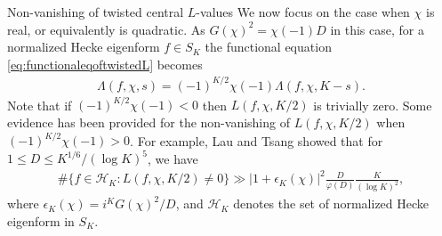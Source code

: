 \documentclass[11pt,letterpaper,reqno]{amsart}
\makeatletter
\numberwithin{figure}{section}
\numberwithin{table}{section}
\theoremstyle{definition}
\theoremstyle{plain}
\theoremstyle{definition}
\theoremstyle{definition}
\theoremstyle{remark}
\numberwithin{equation}{section}
\theoremstyle{remark}
\def\subsection{\@startsection{subsection}{2}%
  \z@{.5\linespacing\@plus.7\linespacing}{.3\linespacing}%
  {\normalfont\bfseries}}
\makeatother
\begin{document}
\subsection{Non-vanishing of twisted central \texorpdfstring{$L$-}-values}
We now focus on the case when $\chi$ is real, or equivalently is quadratic. As $G(\chi)^2=\chi(-1) D$ in this case, for a normalized Hecke eigenform $f\in S_{K}$ the functional equation \eqref{eq:functionaleqoftwistedL} becomes
\begin{align*}
    \Lambda(f,\chi,s)=(-1)^{K/2}\chi(-1)\Lambda(f,\chi,K-s).
\end{align*}
Note that if $(-1)^{K/2}\chi(-1)<0$ then $L(f,\chi,K/2)$ is trivially zero. 
Some evidence has been provided for the non-vanishing of $L(f,\chi,K/2)$ when $(-1)^{K/2}\chi(-1)>0$.
For example, Lau and Tsang \cite{LautwistedcentralLvalues} showed that for $1\leq D\leq K^{1/6}/(\log K)^5$, we have
\begin{align*}
    \#\{f\in\mathcal{H}_K:L(f,\chi,K/2)\neq0\}\gg|1+\epsilon_{K}(\chi)|^2\frac{D}{\varphi(D)}\frac{K}{(\log K)^2},
\end{align*}
where $\epsilon_K(\chi)=i^KG(\chi)^2/D$, and $\mathcal{H}_K$ denotes the set of normalized Hecke eigenform in $S_{K}$.
\end{document}

